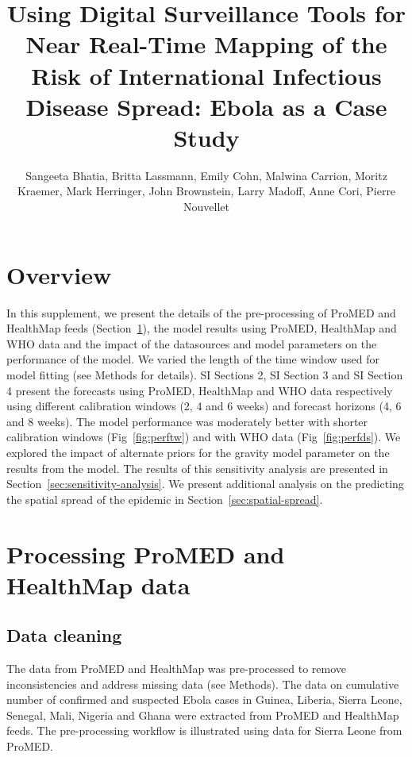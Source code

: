 \documentclass[9pt,twoside,lineno]{pnas-new}
\title{Using Digital Surveillance Tools for Near Real-Time Mapping of
  the Risk of International Infectious Disease Spread: Ebola as a Case
  Study}
\author{Sangeeta Bhatia, Britta Lassmann, Emily Cohn, Malwina Carrion,
Moritz Kraemer, Mark Herringer, John Brownstein, Larry Madoff, Anne
Cori, Pierre Nouvellet}
\begin{document}
\maketitle

\SItext

 
\tableofcontents


\section*{Overview}\label{overview}

In this supplement, we present the details of the pre-processing of
ProMED and HealthMap feeds (Section~\ref{sec:data-cleaning}), 
the model results using ProMED,
HealthMap and WHO data and the impact of the datasources and model
parameters on the performance of the model. We varied the length of the
time window used for model fitting (see Methods for details). SI Sections
2, SI Section 3 and SI Section 4 present the forecasts using ProMED,
HealthMap and WHO data respectively using different calibration windows (2, 4
and 6 weeks) and forecast horizons (4, 6 and 8 weeks). The model
performance was moderately better with shorter calibration windows
(Fig~\ref{fig:perftw}) and with WHO data (Fig~\ref{fig:perfds}).
We explored the impact of alternate priors for the
gravity model parameter on the results from the model. The results of
this sensitivity analysis are presented in
Section~\ref{sec:sensitivity-analysis}. 
We present additional analysis on the predicting the spatial spread of the
epidemic in Section~\ref{sec:spatial-spread}.


\section{Processing ProMED and HealthMap data}\label{sec:data-cleaning}
\subsection{Data cleaning}

The data from ProMED and HealthMap was pre-processed to remove
inconsistencies and address missing data (see Methods). The data on
cumulative number of confirmed and suspected Ebola cases in Guinea,
Liberia, Sierra Leone, Senegal, Mali, Nigeria and Ghana were extracted
from ProMED and HealthMap feeds. The pre-processing workflow is 
illustrated using data for Sierra Leone from ProMED.
\end{document}
